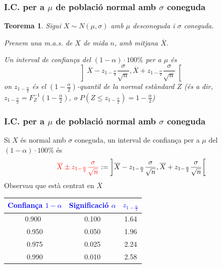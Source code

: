 \documentclass[12pt,t]{beamer}
\newcommand{\red}[1]{\textcolor{red}{#1}}
\newcommand{\blue}[1]{\textcolor{blue}{#1}}
\renewcommand{\leq}{\leqslant}
\theoremstyle{plain}
\newtheorem{teorema}{Teorema}
\theoremstyle{definition}
\begin{document}
\begin{frame}
\frametitle{I.C. per a $\mu$ de població normal amb $\sigma$ coneguda}
\vspace*{-3ex}

\begin{teorema}
Sigui $X\sim N(\mu,\sigma)$ amb $\mu$ desconeguda i $\sigma$ coneguda.
\medskip

Prenem una m.a.s. de $X$ de mida $n$, amb mitjana $\overline{X}$.
\medskip

Un interval de confiança del $(1-\alpha)\cdot 100\%$ per a $\mu$  és 
$$
\left]\overline{X} -z_{1-\frac{\alpha}{2}} \frac{\sigma}{\sqrt{n}}, \overline{X}+z_{1-\frac{\alpha}{2}}\frac{\sigma}{\sqrt{n}}
\right[
$$
on $z_{1-\frac{\alpha}{2}}$ és el $(1-\frac{\alpha}{2})$-quantil de la normal  estàndard $Z$ (és a dir, $z_{1-\frac{\alpha}{2}}=F_Z^{-1}(1-\frac{\alpha}{2})$, o $P(Z\leq z_{1-\frac{\alpha}{2}})=1-\frac{\alpha}{2}$)
\end{teorema}


\end{frame}


\begin{frame}
\frametitle{I.C. per a $\mu$ de població normal amb $\sigma$ coneguda}

Si $X$ és normal amb $\sigma$ coneguda, un interval de confiança per a $\mu$ del $(1-\alpha)\cdot 100\%$ és 
$$
\red{\overline{X} \pm z_{1-\frac{\alpha}{2}} \frac{\sigma}{\sqrt{n}}}:=\left]\overline{X} -z_{1-\frac{\alpha}{2}} \frac{\sigma}{\sqrt{n}}, \overline{X}+z_{1-\frac{\alpha}{2}}\frac{\sigma}{\sqrt{n}}
\right[
$$
Observau que està centrat en $\overline{X}$
\begin{center}
\begin{tabular}{c|c|c}
\blue{Confiança $1-\alpha$} & \blue{Significació $\alpha$} & \blue{$z_{1-\frac{\alpha}{2}}$}\\
 \hline
0.900\ & 0.100 &1.64 \\   
0.950 & 0.050 & 1.96\\
0.975 & 0.025 & 2.24 \\
0.990 & 0.010 & 2.58
\end{tabular}
\end{center}


\end{frame}
\end{document}
